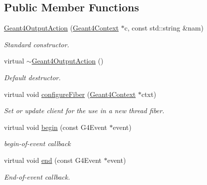 \subsection*{Public Member Functions}
\begin{DoxyCompactItemize}
\item 
\hyperlink{class_d_d4hep_1_1_simulation_1_1_geant4_output_action_a983f32c2248efafa8c632b9608820f86}{Geant4OutputAction} (\hyperlink{class_d_d4hep_1_1_simulation_1_1_geant4_context}{Geant4Context} $\ast$c, const std::string \&nam)
\begin{DoxyCompactList}\small\item\em Standard constructor. \item\end{DoxyCompactList}\item 
virtual \hyperlink{class_d_d4hep_1_1_simulation_1_1_geant4_output_action_aeead76ac5f330277dfb11c924bbfbc08}{$\sim$Geant4OutputAction} ()
\begin{DoxyCompactList}\small\item\em Default destructor. \item\end{DoxyCompactList}\item 
virtual void \hyperlink{class_d_d4hep_1_1_simulation_1_1_geant4_output_action_abc1171027ea0a21fedef2d49a14ec557}{configureFiber} (\hyperlink{class_d_d4hep_1_1_simulation_1_1_geant4_context}{Geant4Context} $\ast$ctxt)
\begin{DoxyCompactList}\small\item\em Set or update client for the use in a new thread fiber. \item\end{DoxyCompactList}\item 
virtual void \hyperlink{class_d_d4hep_1_1_simulation_1_1_geant4_output_action_afaad36616c890ac39e80421d340efd47}{begin} (const G4Event $\ast$event)
\begin{DoxyCompactList}\small\item\em begin-\/of-\/event callback \item\end{DoxyCompactList}\item 
virtual void \hyperlink{class_d_d4hep_1_1_simulation_1_1_geant4_output_action_a6fa4e933973a42a00b7be10292619780}{end} (const G4Event $\ast$event)
\begin{DoxyCompactList}\small\item\em End-\/of-\/event callback. \item\end{DoxyCompactList}\item 

\end{DoxyCompactItemize}
